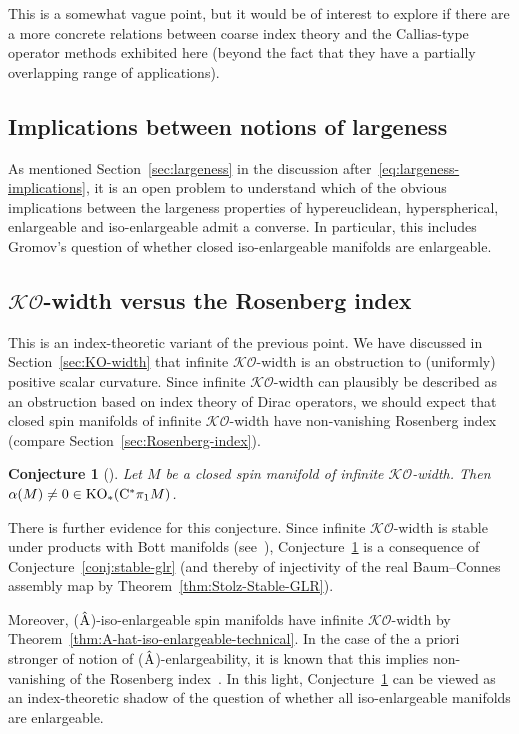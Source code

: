 \documentclass[pdftex]{sigma}
\numberwithin{equation}{section}
\newtheorem{Conjecture}[Theorem]{Conjecture}
 { \theoremstyle{definition}
\newtheorem{Definition}[Theorem]{Definition}
\newtheorem{Note}[Theorem]{Note}
\newtheorem{Example}[Theorem]{Example}
\newtheorem{Remark}[Theorem]{Remark} }
\begin{document}
This is a somewhat vague point, but it would be of interest to explore if there are a more concrete relations between coarse index theory and the Callias-type operator methods exhibited here (beyond the fact that they have a partially overlapping range of applications).

\subsection{Implications between notions of largeness}
As mentioned Section~\ref{sec:largeness} in the discussion after~\eqref{eq:largeness-implications}, it is an open problem to understand which of the obvious implications between the largeness properties of hypereuclidean, hyperspherical, enlargeable and iso-enlargeable admit a converse.
In particular, this includes Gromov's question of whether closed iso-enlargeable manifolds are enlargeable.

\subsection[KO-width versus the Rosenberg index]{\(\boldsymbol{\mathcal{KO}}\)-width versus the Rosenberg index}
This is an index-theoretic variant of the previous point.
We have discussed in Section~\ref{sec:KO-width} that infinite \(\mathcal{KO}\)-width is an obstruction to (uniformly) positive scalar curvature.
Since infinite \(\mathcal{KO}\)-width can plausibly be described as an obstruction based on index theory of Dirac operators, we should expect that closed spin manifolds of infinite \(\mathcal{KO}\)-width have non-vanishing Rosenberg index (compare Section~\ref{sec:Rosenberg-index}).

\begin{Conjecture}[{\cite[Conjecture~4.12]{Zeidler:band-width-estimates}}] \label{conj:KO-width}
 Let \(M\) be a closed spin manifold of infinite \(\mathcal{KO}\)-width.
 Then \(\alpha(M) \neq 0 \in \operatorname{KO}_\ast(\mathrm{C}^\ast \pi_1 M)\).
\end{Conjecture}

There is further evidence for this conjecture.
Since infinite \(\mathcal{KO}\)-width is stable under products with Bott manifolds (see~\cite[Section~4]{Zeidler:band-width-estimates}), Conjecture~\ref{conj:KO-width} is a consequence of Conjecture~\ref{conj:stable-glr} (and thereby of injectivity of the real Baum--Connes assembly map by Theorem~\ref{thm:Stolz-Stable-GLR}).

Moreover, (\(\hat{\mathrm{A}}\))-iso-enlargeable spin manifolds have infinite \(\mathcal{KO}\)-width by Theorem~\ref{thm:A-hat-iso-enlargeable-technical}.
In the case of the a priori stronger of notion of (\(\hat{\mathrm{A}}\))-enlargeability, it is known that this implies non-vanishing of the Rosenberg index~\cite{Hanke-Kotschick-Roe-Schick:Coarse-Top-Enlargeability,HankeSchick:Enlargeable,HankeSchick:EnlargeableInfinite}.
In this light, Conjecture~\ref{conj:KO-width} can be viewed as an index-theoretic shadow of the question of whether all iso-enlargeable manifolds are enlargeable.
\end{document}
